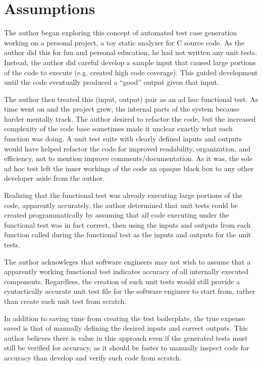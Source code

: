 \section{Assumptions}\label{sec:introduction}

The author began exploring this concept of automated test case generation
working on a personal project, a toy static analyzer for C source code.  As the
author did this for fun and personal education, he had not written any unit
tests.  Instead, the author did careful develop a sample input that caused large
portions of the code to execute (e.g. created high code coverage).  This guided
development until the code eventually produced a “good” output given that input.

  
\indent
The author then treated this (input, output) pair as an ad hoc functional test.
As time went on and the project grew, the internal parts of the system because
harder mentally track.  The author desired to refactor the code, but the
increased complexity of the code base sometimes made it unclear exactly what
each function was doing.  A unit test suite with clearly defined inputs and
outputs would have helped refactor the code for improved readability,
organization, and efficiency, not to mention improve comments/documentation.  As
it was, the sole ad hoc test left the inner workings of the code an opaque black
box to any other developer aside from the author.

Realizing that the functional test was already executing large portions of the
 code, apparently accurately, the author determined that unit tests could be
 created programmatically by assuming that all code executing under the
 functional test was in fact correct, then using the inputs and outputs from each
 function called during the functional test as the inputs and outputs for the
 unit tests.  
 
 The author acknowleges that software engineers may not 
 wish to assume that a apparently working functional test indicates accuracy of 
 all internally executed components. Regardless, the creation of such unit 
 tests would still provide a syntactically accurate unit
 test file for the software engineer to start from, rather than create each unit
 test from scratch.  
 
 In addition to saving time from creating the test
 boilerplate, the true expense saved is that of manually defining the desired
 inputs and correct outputs.  This author believes there is value in this
 approach even if the generated tests must still be verified for accuracy, as it
 should be faster to manually inspect code for accuracy than develop and verify
 such code from scratch.

